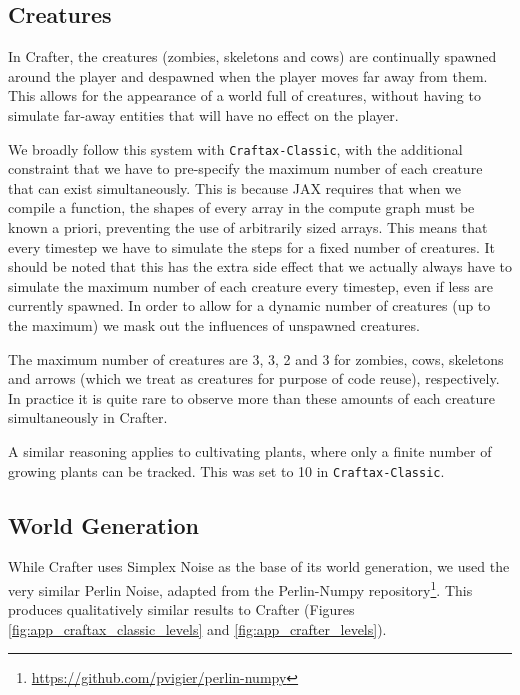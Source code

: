 \documentclass{article}
\theoremstyle{plain}
\theoremstyle{definition}
\theoremstyle{remark}
\begin{document}
\subsection{Creatures}

In Crafter, the creatures (zombies, skeletons and cows) are continually spawned around the player and despawned when the player moves far away from them.  This allows for the appearance of a world full of creatures, without having to simulate far-away entities that will have no effect on the player.

We broadly follow this system with \texttt{Craftax-Classic}, with the additional constraint that we have to pre-specify the maximum number of each creature that can exist simultaneously.  This is because JAX requires that when we compile a function, the shapes of every array in the compute graph must be known a priori, preventing the use of arbitrarily sized arrays.  This means that every timestep we have to simulate the steps for a fixed number of creatures.  It should be noted that this has the extra side effect that we actually always have to simulate the maximum number of each creature every timestep, even if less are currently spawned.  In order to allow for a dynamic number of creatures (up to the maximum) we mask out the influences of unspawned creatures.

The maximum number of creatures are 3, 3, 2 and 3 for zombies, cows, skeletons and arrows (which we treat as creatures for purpose of code reuse), respectively.  In practice it is quite rare to observe more than these amounts of each creature simultaneously in Crafter.

A similar reasoning applies to cultivating plants, where only a finite number of growing plants can be tracked.  This was set to 10 in \texttt{Craftax-Classic}.

\subsection{World Generation}

While Crafter uses Simplex Noise as the base of its world generation, we used the very similar Perlin Noise, adapted from the Perlin-Numpy repository\footnote{\url{https://github.com/pvigier/perlin-numpy}}.  This produces qualitatively similar results to Crafter (Figures \ref{fig:app_craftax_classic_levels} and \ref{fig:app_crafter_levels}).
\end{document}
